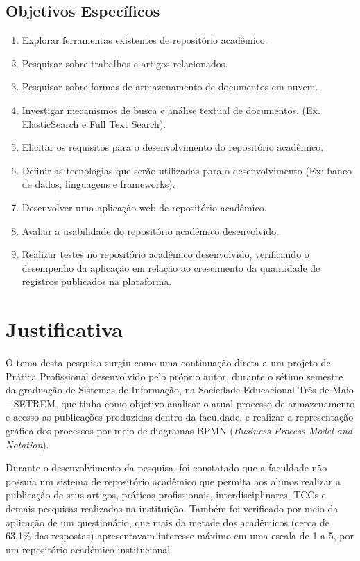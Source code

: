 \subsection{Objetivos Específicos}
\begin{enumerate}
    \item Explorar ferramentas existentes de repositório acadêmico.
    \item Pesquisar sobre trabalhos e artigos relacionados.
    \item Pesquisar sobre formas de armazenamento de documentos em nuvem.
    \item Investigar mecanismos de busca e análise textual de documentos. (Ex. ElasticSearch e Full Text Search).
    \item Elicitar os requisitos para o desenvolvimento do repositório acadêmico.
    \item Definir as tecnologias que serão utilizadas para o desenvolvimento (Ex: banco de dados, linguagens e frameworks).
    \item Desenvolver uma aplicação web de repositório acadêmico.
    \item Avaliar a usabilidade do repositório acadêmico desenvolvido.
    \item Realizar testes no repositório acadêmico desenvolvido, verificando o desempenho da aplicação em relação ao crescimento da quantidade de registros publicados na plataforma.

\end{enumerate}


\section{Justificativa}\label{sec:justification}

O tema desta pesquisa surgiu como uma continuação direta a um projeto
de Prática Profissional desenvolvido pelo próprio autor, durante o sétimo
semestre da graduação de Sistemas de Informação, na Sociedade Educacional
Três de Maio – SETREM, que tinha como objetivo analisar o atual processo
de armazenamento e acesso as publicações produzidas dentro da faculdade,
e realizar a representação gráfica dos processos por meio de diagramas BPMN
(\emph{Business Process Model and Notation}).

Durante o desenvolvimento da pesquisa, foi constatado que a faculdade
não possuía um sistema de repositório acadêmico que permita aos
alunos realizar a publicação de seus artigos, práticas profissionais,
interdisciplinares, TCCs e demais pesquisas realizadas na instituição.
Também foi verificado por meio da aplicação de um questionário, que
mais da metade dos acadêmicos (cerca de 63,1\% das respostas) apresentavam
interesse máximo em uma escala de 1 a 5, por um repositório acadêmico
institucional.

